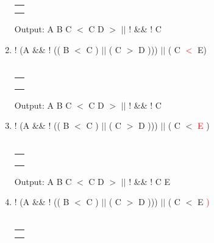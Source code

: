 \documentclass[a4paper]{article}
\begin{document}
\begin{large}
\begin{enumerate}
\begin{tabular}[t]{ | p{1.6em} | }
            \makecell{}     \\ \hline
            \makecell{(}    \\ \hline
            \makecell{$||$} \\ \hline
          \end{tabular}
          \hspace{2em}
          Output: A B C $<$ C D $>$ $||$ ! \&\& ! C
          \newpage
    \item
          ! (A \&\& ! (( B $<$ C ) $||$ ( C $>$ D ))) $||$ ( C \textcolor{red}{ $<$} E) \\
          \\
          \begin{tabular}[t]{ | p{1.6em} | }
            \makecell{}     \\ \hline
            \makecell{$<$}  \\ \hline
            \makecell{(}    \\ \hline
            \makecell{$||$} \\ \hline
          \end{tabular}
          \hspace{2em}
          Output: A B C $<$ C D $>$ $||$ ! \&\& ! C
    \item
          ! (A \&\& ! (( B $<$ C ) $||$ ( C $>$ D ))) $||$ ( C $<$ \textcolor{red}{E} ) \\
          \\
          \begin{tabular}[t]{ | p{1.6em} | }
            \makecell{}     \\ \hline
            \makecell{$<$}  \\ \hline
            \makecell{(}    \\ \hline
            \makecell{$||$} \\ \hline
          \end{tabular}
          \hspace{2em}
          Output: A B C $<$ C D $>$ $||$ ! \&\& ! C E
    \item
          ! (A \&\& ! (( B $<$ C ) $||$ ( C $>$ D ))) $||$ ( C $<$ E \textcolor{red}{)} \\
          \\
          \begin{tabular}[t]{ | p{1.6em} | }
            \makecell{}     \\ \hline
            \makecell{}     \\ \hline
            \makecell{}     \\ \hline

\end{tabular}
\end{enumerate}
\end{large}
\end{document}
